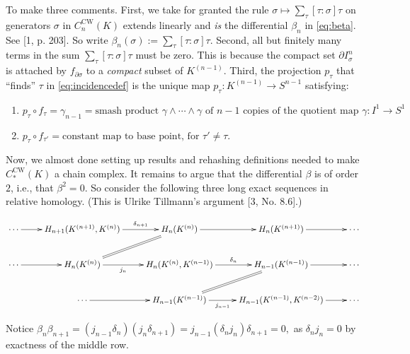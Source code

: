 \documentclass[10pt]{amsart}
\providecommand{\tightlist}{%
  \setlength{\itemsep}{0pt}\setlength{\parskip}{0pt}}
\begin{document}
To make three comments. First, we take for granted the rule
\(\sigma \mapsto \sum_\tau [\tau : \sigma] \tau\) on generators
\(\sigma\) in \(C^{\text{CW}}_n(K)\) extends linearly and \emph{is} the
differential \(\beta_n\) in \eqref{eq:beta}. See {[}1, p. 203{]}. So
write \(\beta_n(\sigma) := \sum_\tau [\tau : \sigma] \tau\). Second, all
but finitely many terms in the sum \(\sum_\tau [\tau : \sigma]\tau\)
must be zero. This is because the compact set \(\partial I^n_\sigma\) is
attached by \(f_{\partial \sigma}\) to a \emph{compact} subset of
\(K^{( n-1 )}\). Third, the projection \(p_\tau\) that ``finds''
\(\tau\) in \eqref{eq:incidencedef} is the unique map
\(p_\tau \colon K^{( n-1 )} \to S^{n-1}\) satisfying:

\begin{enumerate}
\def\labelenumi{\roman{enumi}.}
\tightlist
\item
  \(p_\tau \circ f_\tau = \gamma_{n-1} = \text{smash product $\gamma \wedge \cdots \wedge \gamma$ of $n-1$ copies of the quotient map $\gamma\colon I^1 \to S^1$}\)
\item
  \(p_\tau \circ f_{\tau'} = \text{constant map to base point, for $\tau' \neq \tau$}\).
\end{enumerate}

Now, we almost done setting up results and rehashing definitions needed
to make \(C^{\text{CW}}_*(K)\) a chain complex. It remains to argue that
the differential \(\beta\) is of order \(2\), i.e., that
\(\beta^2 = 0\). So consider the following three long exact sequences in
relative homology. (This is Ulrike Tillmann's argument {[}3, No.
8.6{]}.)

\begin{equation}
\xymatrix{
\cdots \ar[r]
    & H_{n+1}(K^{( n+1 )}, K^{( n )}) \ar[r]^-{\delta_{n+1}}
    & H_n( K^{( n )} ) \ar[r] \ar@{=}[dl]
    & H_n( K^{( n+1 )}) \ar[r]
    & \cdots\\
\cdots \ar[r] 
    & H_n(K^{( n )}) \ar[r]_-{j_n}
    & H_n(K^{( n )}, K^{( n-1 )}) \ar[r]^-{\delta_n}
    & H_{n-1} (K^{( n-1 )}) \ar[r] \ar@{=}[dl]
    & \cdots\\
& \cdots \ar[r]
    & H_{n-1}(K^{( n -1 )}) \ar[r]_-{j_{n-1}}
    & H_{n-1} (K^{( n-1 )}, K^{( n-2 )}) \ar[r]
    & \cdots
}
\label{eq:order2}
\end{equation}

Notice
\(\beta_{n} \beta_{n+1} = (j_{n-1}\delta_n) (j_n \delta_{n+1}) = j_{n-1} (\delta_n j_n) \delta_{n+1} = 0,\)
as \(\delta_n j_n = 0\) by exactness of the middle row.
\end{document}
